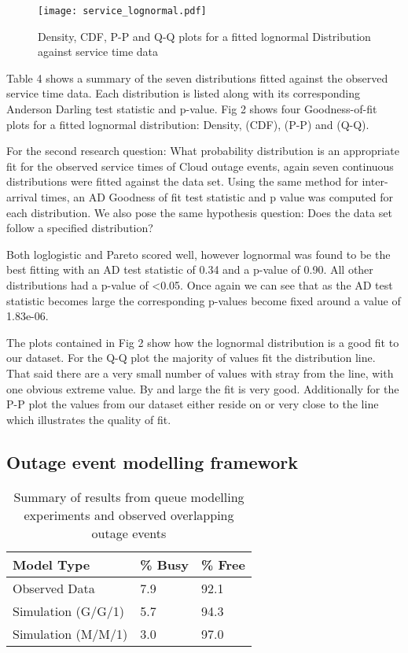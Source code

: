 \documentclass[5p]{elsarticle}
\begin{document}
\begin{figure*}[]
\begin{center}
\texttt{[image: service\_lognormal.pdf]} 
\caption{Density, CDF, P-P and Q-Q plots for a fitted lognormal Distribution against service time data}
\end{center}
\label{fig:outagedistribution}
\end{figure*}


Table 4 shows a summary of the seven distributions fitted against the observed service time data. Each distribution is listed along with its corresponding Anderson Darling test statistic and p-value. Fig 2 shows four Goodness-of-fit plots for a fitted lognormal distribution: Density, (CDF), (P-P)  and (Q-Q).  

For the second research question: What probability distribution is an appropriate fit for the observed service times of Cloud outage events, again seven continuous distributions were fitted against the data set. Using the same method for inter-arrival times, an AD Goodness of fit test statistic and p value was computed for each distribution. We also pose the same hypothesis question: Does the data set follow a specified distribution?

Both loglogistic and Pareto scored well, however lognormal was found to be the best fitting with an AD test statistic of 0.34 and a p-value of 0.90. All other distributions had a p-value of \textless 0.05. Once again we can see that as the AD test statistic becomes large the corresponding p-values become fixed around a value of 1.83e-06.

The plots contained in Fig 2 show how the lognormal distribution is a good fit to our dataset. For the Q-Q plot the majority of values fit the distribution line. That said there are a very small number of values with stray from the line, with one obvious extreme value. By and large the fit is very good. Additionally for the P-P plot the values from our dataset either reside on or very close to the line which illustrates the quality of fit.


\subsection{Outage event modelling framework}

\begin {table}[]
\caption {Summary of results from queue modelling experiments and observed overlapping outage events} 
\begin{center}
\begin{tabular}{l | l | l} \bf{Model Type} & \bf {\% Busy} & \bf {\% Free}
\\ \hline Observed Data & 7.9 &  92.1 
\\  Simulation (G/G/1) & 5.7 &  94.3 
\\  Simulation (M/M/1) & 3.0  &  97.0 
\\ \hline 
 \end{tabular}
\end{center}
\end{table}
\end{document}
